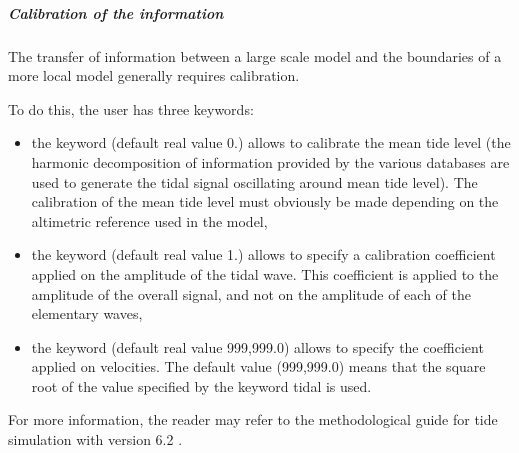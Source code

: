 \subparagraph{Calibration of the information}

The transfer of information between a large scale model and the boundaries of
a more local model generally requires calibration.

To do this, the user has three keywords:

\begin{itemize}
\item the keyword  (default real
value 0.) allows to calibrate the mean tide level (the harmonic decomposition
of information provided by the various databases are used to generate the tidal
signal oscillating around mean tide level).
The calibration of the mean tide level must obviously be made depending on the
altimetric reference used in the model,

\item the keyword  (default real
value 1.) allows to specify a calibration coefficient applied on the amplitude
of the tidal wave.
This coefficient is applied to the amplitude of the overall signal, and not on
the amplitude of each of the elementary waves,

\item the keyword 
(default real value 999,999.0) allows to specify the coefficient applied on
velocities.
The default value (999,999.0) means that the square root of the value specified
by the keyword  tidal is used.
\end{itemize}

For more information, the reader may refer to the methodological guide
for tide simulation with version 6.2 \cite{Pham2012}.
